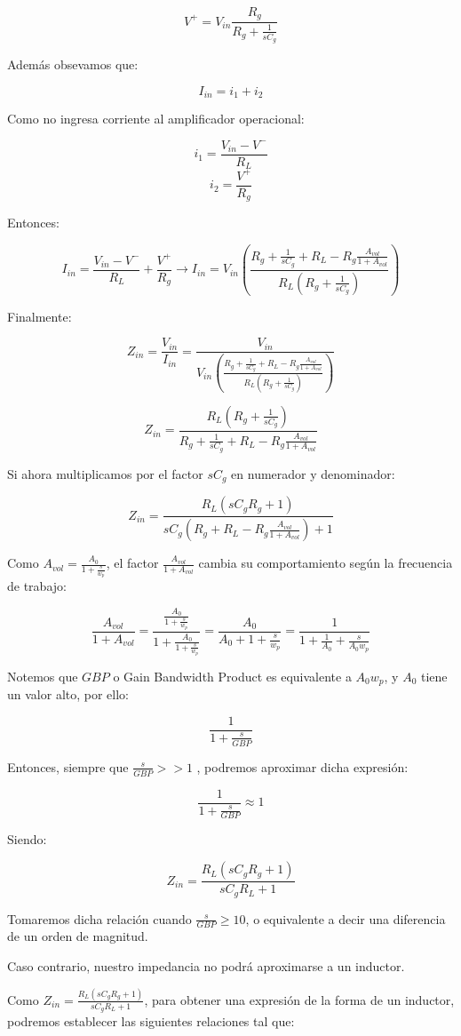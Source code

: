 $$V^+= V_{in}\frac{R_g}{R_g+\frac{1}{sC_g}}$$

Además obsevamos que:

$$I_{in}=i_1+i_2$$

Como no ingresa corriente al amplificador operacional:

$$i_1=\frac{V_{in}-V^-}{R_L}$$
$$i_2=\frac{V^+}{R_g}$$

Entonces:

$$I_{in}=\frac{V_{in}-V^-}{R_L}+\frac{V^+}{R_g} \longrightarrow 
I_{in}=V_{in}(\frac{R_g+\frac{1}{sC_g}+R_L-R_g\frac{A_{vol}}{1+A_{vol}}}{R_L(R_g+\frac{1}{sC_g})})$$

Finalmente:

$$Z_{in}=\frac{V_{in}}{I_{in}}=\frac{V_{in}}{V_{in}(\frac{R_g+\frac{1}{sC_g}+R_L-R_g\frac{A_{vol}}{1+A_{vol}}}{R_L(R_g+\frac{1}{sC_g})})}$$

$$Z_{in}=\frac{R_L(R_g+\frac{1}{sC_g})}{R_g+\frac{1}{sC_g}+R_L-R_g\frac{A_{vol}}{1+A_{vol}}}$$

Si ahora multiplicamos por el factor $sC_g$ en numerador y denominador:

$$Z_{in}=\frac{R_L(sC_gR_g+1)}{sC_g(R_g+R_L-R_g\frac{A_{vol}}{1+A_{vol}})+1}$$

Como $A_{vol}=\frac{A_0}{1+\frac{s}{w_p}}$, el factor $\frac{A_{vol}}{1+A_{vol}}$ cambia su comportamiento
según la frecuencia de trabajo:

$$\frac{A_{vol}}{1+A_{vol}}=\frac{\frac{A_0}{1+\frac{s}{w_p}}}{1+\frac{A_0}{1+\frac{s}{w_p}}}=
\frac{A_0}{A_0+1+\frac{s}{w_p}}=\frac{1}{1+\frac{1}{A_0}+\frac{s}{A_0w_p}}$$

Notemos que $GBP$ o Gain Bandwidth Product es equivalente a $A_0w_p$, y $A_0$ tiene un valor alto, por ello:

$$\frac{1}{1+\frac{s}{GBP}}$$

Entonces, siempre que $\frac{s}{GBP} >> 1$ , podremos aproximar dicha expresión:

$$\frac{1}{1+\frac{s}{GBP}} \approx 1$$

Siendo:

$$Z_{in}=\frac{R_L(sC_gR_g+1)}{sC_gR_L+1}$$

Tomaremos dicha relación cuando $\frac{s}{GBP} \geq 10$, o equivalente a decir una diferencia de un orden de magnitud.

Caso contrario, nuestro impedancia no podrá aproximarse a un inductor.

Como $Z_{in}=\frac{R_L(sC_gR_g+1)}{sC_gR_L+1}$, para obtener una expresión de la forma de un inductor,
podremos establecer las siguientes relaciones tal que:

